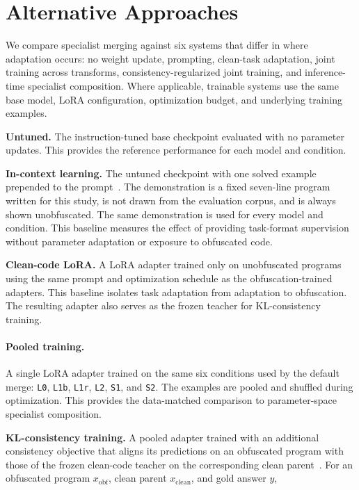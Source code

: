 \section{Alternative Approaches}
\label{sec:baselines}

We compare specialist merging against six systems that differ in where
adaptation occurs: no weight update, prompting, clean-task adaptation,
joint training across transforms, consistency-regularized joint training,
and inference-time specialist composition. Where applicable, trainable systems
use the same base model, LoRA configuration, optimization budget, and underlying
training examples.

\noindent\textbf{Untuned.}
The instruction-tuned base checkpoint evaluated with no parameter updates.
This provides the reference performance for each model and condition.

\noindent\textbf{In-context learning.}
The untuned checkpoint with one solved example prepended to the
prompt~\cite{fewshot}. The demonstration is a fixed seven-line program written
for this study, is not drawn from the evaluation corpus, and is always shown
unobfuscated. The same demonstration is used for every model and condition.
This baseline measures the effect of providing task-format supervision without
parameter adaptation or exposure to obfuscated code.

\noindent\textbf{Clean-code LoRA.}
A LoRA adapter trained only on unobfuscated programs using the same prompt and
optimization schedule as the obfuscation-trained adapters. This baseline
isolates task adaptation from adaptation to obfuscation. The resulting adapter
also serves as the frozen teacher for KL-consistency training.

\paragraph{Pooled training.}
A single LoRA adapter trained on the same six conditions used by the default
merge: \texttt{L0}, \texttt{L1b}, \texttt{L1r}, \texttt{L2}, \texttt{S1},
and \texttt{S2}. The examples are pooled and shuffled during optimization.
This provides the data-matched comparison to parameter-space specialist
composition.

\noindent\textbf{KL-consistency training.}
A pooled adapter trained with an additional consistency objective that aligns
its predictions on an obfuscated program with those of the frozen clean-code
teacher on the corresponding clean parent~\cite{distillation}. For an
obfuscated program $x_{\mathrm{obf}}$, clean parent $x_{\mathrm{clean}}$, and
gold answer $y$,

